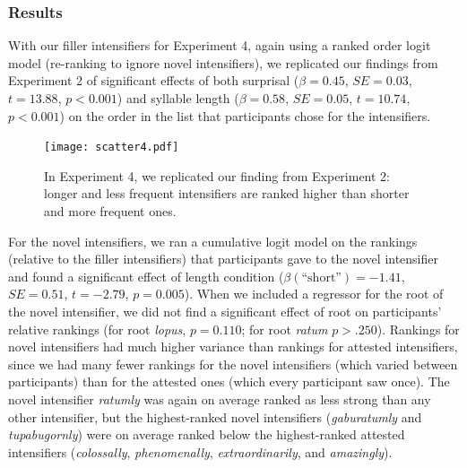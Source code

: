 \documentclass[10pt,letterpaper]{article}
\newcommand{\w}[1]{\emph{#1}}
\newcommand{\ndg}[1]{{\color{green}#1}}
\begin{document}
\subsubsection{Results}
With our filler intensifiers for Experiment 4, again using a ranked order logit model (re-ranking to ignore novel intensifiers), we replicated our findings from Experiment 2 of significant effects of both surprisal ($\beta=0.45$, $SE=0.03$, $t=13.88$, $p<0.001$)
and syllable length ($\beta=0.58$, $SE=0.05$, $t=10.74$, $p<0.001$) on the order in the list that participants chose for the intensifiers.

\begin{figure}[hbt]
\begin{center}
\texttt{[image: scatter4.pdf]}
\end{center}
\caption{In Experiment 4, we replicated our finding from Experiment 2: longer and less frequent intensifiers are ranked higher than shorter and more frequent ones.} 
\label{exp4_replication}
\end{figure}

For the novel intensifiers, we ran a cumulative logit model on the rankings (relative to the filler intensifiers) that participants gave to the novel intensifier and found a significant effect of length condition ($\beta(\mbox{``short''})=-1.41$, $SE=0.51$, $t=-2.79$, $p=0.005$).
When we included a regressor for the root of the novel intensifier, we did not find a significant effect of root on participants' relative rankings (for root \w{lopus}, $p=0.110$; for root \w{ratum} $p>.250$).
Rankings for novel intensifiers had much higher variance than rankings for attested intensifiers, since we had many fewer rankings for the novel intensifiers (which varied between participants) than for the attested ones (which every participant saw once). The novel intensifier \w{ratumly} was again on average ranked as less strong than any other intensifier, but the highest-ranked novel intensifiers (\w{gaburatumly} and \w{tupabugornly}) were on average ranked below the highest-ranked attested intensifiers (\w{colossally}, \w{phenomenally}, \w{extraordinarily}, and \w{amazingly}).

\end{document}
